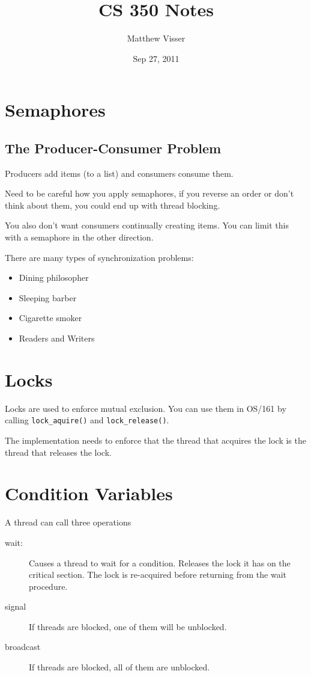 \documentclass[12pt]{article}
\begin{document}
\title{CS 350 Notes}
\author{Matthew Visser}
\date{Sep 27, 2011}
\maketitle

\section{Semaphores}

\subsection{The Producer-Consumer Problem}

Producers add items (to a list) and consumers consume them.

Need to be careful how you apply semaphores, if you reverse an order or don't
think about them, you could end up with thread blocking.

You also don't want consumers continually creating items. You can limit this
with a semaphore in the other direction.

There are many types of synchronization problems:
\begin{itemize}
    \item Dining philosopher
    \item Sleeping barber
    \item Cigarette smoker
    \item Readers and Writers
\end{itemize}

\section{Locks}

Locks are used to enforce mutual exclusion. You can use them in OS/161 by
calling \texttt{lock\_aquire()} and \texttt{lock\_release()}.

The implementation needs to enforce that the thread that acquires the lock is
the thread that releases the lock.

\section{Condition Variables}

A thread can call three operations
\begin{description}
    \item[wait:] Causes a thread to wait for a condition. Releases the lock it
        has on the critical section. The lock is re-acquired before returning
        from the wait procedure.
    \item[signal] If threads are blocked, one of them will be unblocked.
    \item[broadcast]  If threads are blocked, all of them are unblocked.
\end{description}
\end{document}
